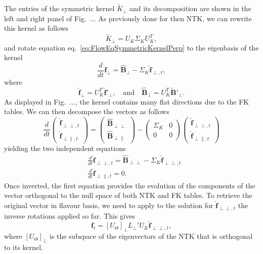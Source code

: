 \documentclass[11pt]{article}
\begin{document}
The entries of the symmetric kernel $\tilde{K}_{\perp}$ and its decomposition are shown
in the left and right panel of Fig.~... As previously done for then NTK, we can rewrite
this kernel as follows
\begin{equation}
  \tilde{K}_{\perp} = U_{K} \Sigma_K U_{K}^T,
  \label{eq:SymmetricKernelDecomposition}
\end{equation}
and rotate equation eq.~\eqref{eq:FlowEqSymmetricKernelPerp} to the eigenbasis of the kernel
\begin{equation}
  \frac{d}{dt} \hat{\pmb{f}}_{\perp} = \hat{\pmb{B}}_{\perp} - \Sigma_K \hat{\pmb{f}}_{\perp, t},
\end{equation}
where
\begin{equation}
  \hat{\pmb{f}}_{\perp} = U_{K}^T \tilde{\pmb{f}}'_{\perp}, \quad
  \text{and} \quad
  \hat{\pmb{B}}_{\perp} = U_{K}^T \tilde{\pmb{B}}'_{\perp}.
\end{equation}
As displayed in Fig.~..., the kernel contains many flat directions due to the FK tables. We can
then decompose the vectors as follows
\begin{equation}
  \frac{d}{dt} 
  \left(
    \begin{matrix}
      \hat{\pmb{f}}_{\perp \perp,t} \\
      \hat{\pmb{f}}_{\perp \parallel,t}
    \end{matrix}
  \right)
  =
  \left(
    \begin{matrix}
      \hat{\pmb{B}}_{\perp \perp} \\
      \hat{\pmb{B}}_{\perp \parallel}
    \end{matrix}
  \right)
  -
  \left(
    \begin{matrix}
      \Sigma_{K} & 0 \\
      0 & 0
    \end{matrix}
  \right)
  \left(
    \begin{matrix}
      \hat{\pmb{f}}_{\perp \perp,t} \\
      \hat{\pmb{f}}_{\perp \parallel,t}
    \end{matrix}
  \right)
\end{equation}
yielding the two independent equations
\begin{align}
  & \frac{d}{dt}\hat{\pmb{f}}_{\perp \perp,t} = 
  \hat{\pmb{B}}_{\perp \perp} - \Sigma_K \hat{\pmb{f}}_{\perp \perp,t} \\[5pt]
  & \frac{d}{dt}\hat{\pmb{f}}_{\perp \parallel,t} = 0.
\end{align}
Once inverted, the first equation provides the evolution of the components of the vector
orthogonal to the null space of both NTK and FK tables. To retrieve the original vector
in flavour basis, we need to apply to the solution for $\hat{\pmb{f}}_{\perp \perp,t}$
the inverse rotations applied so far. This gives
\begin{equation}
  \pmb{f}_t = \left[ U_{\Theta} \right]_{\perp} L_{\perp}' U_K \hat{\pmb{f}}_{\perp \perp,t},
\end{equation}
where $\left[ U_{\Theta} \right]_{\perp}$ is the subspace of the eigenvectors of the NTK that
is orthogonal to its kernel.
\end{document}
